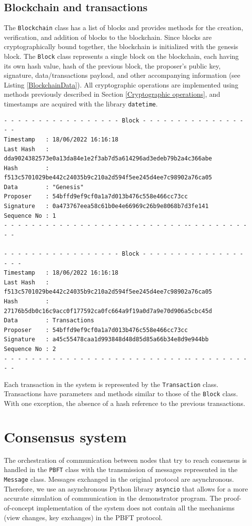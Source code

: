 \subsection{Blockchain and transactions}
The \texttt{Blockchain} class has a list of blocks and provides methods for the creation, verification, and addition of blocks to the blockchain. Since blocks are cryptographically bound together, the blockchain is initialized with the genesis block. The \texttt{Block} class represents a single block on the blockchain, each having its own hash value, hash of the previous block, the proposer's public key, signature, data/transactions payload, and other accompanying information (see Listing \ref{BlockchainData}). All cryptographic operations are implemented using methods previously described in Section \ref{Cryptographic operations}, and timestamps are acquired with the library \texttt{datetime}.
\begin{lstlisting}[frame=single,breaklines=false, caption={Two blocks chained together to form blockchain.},captionpos=b, label={BlockchainData}]
- - - - - - - - - - - - - - - - - Block - - - - - - - - - - - - - - - - -
Timestamp   : 18/06/2022 16:16:18
Last Hash   : dda9024382573e0a13da84e1e2f3ab7d5a614296ad3edeb79b2a4c366abe
Hash        : f513c5701029be442c24035b9c210a2d594f5ee245d4ee7c98902a76ca05
Data        : "Genesis"
Proposer    : 54bffd9ef9cf0a1a7d013b476c558e466cc73cc
Signature   : 0a473767eea58c61b0e4e66969c26b9e8068b7d3fe141
Sequence No : 1
- - - - - - - - - - - - - - - - - - - - - - - - - - -- - - - - - - - - - -
        
- - - - - - - - - - - - - - - - - Block - - - - - - - - - - - - - - - - - -
Timestamp   : 18/06/2022 16:16:18
Last Hash   : f513c5701029be442c24035b9c210a2d594f5ee245d4ee7c98902a76ca05
Hash        : 27176b5db0c16c9acc0f177592ca0fc664a9f19a0d7a9e70d906a5cbc45d
Data        : Transactions
Proposer    : 54bffd9ef9cf0a1a7d013b476c558e466cc73cc
Signature   : a45c55478caa1d993848d48d85d85a66b34e8d9e944bb
Sequence No : 2
- - - - - - - - - - - - - - - - - - - - - - - - - - -- - - - - - - - - - - 
\end{lstlisting}

Each transaction in the system is represented by the \texttt{Transaction} class. Transactions have parameters and methods similar to those of the \texttt{Block} class. With one exception, the absence of a hash reference to the previous transactions.

\section{Consensus system}
The orchestration of communication between nodes that try to reach consensus is handled in the \texttt{PBFT} class with the transmission of messages represented in the \texttt{Message} class. Messages exchanged in the original protocol are asynchronous. Therefore, we use an asynchronous Python library \texttt{asyncio} that allows for a more accurate simulation of communication in the demonstrator program. The proof-of-concept implementation of the system does not contain all the mechanisms (view changes, key exchanges) in the PBFT protocol.

